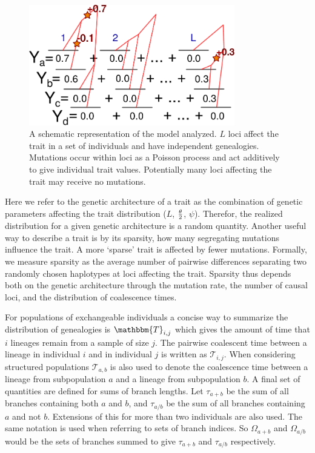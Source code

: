 \begin{figure}
  \centering
  \includegraphics[width=0.8\textwidth]{figures/schema.pdf}
  \caption{A schematic representation of the model analyzed.
  $L$ loci affect the trait in a set of individuals and have independent
  genealogies. Mutations occur within loci as a Poisson process and act
  additively to give individual trait values. Potentially many loci affecting
  the trait may receive no mutations.}
  \label{fig:schema}
\end{figure}

Here we refer to the genetic architecture of a trait as the combination of
genetic parameters affecting the trait distribution ($L$, $\frac{\theta}{2}$, $\psi$).
Therefor, the realized distribution for a given genetic architecture is a random
quantity. Another useful way to describe a trait is by its sparsity, how many
segregating mutations influence the trait. A more `sparse' trait is affected by
fewer mutations. Formally, we measure sparsity as the average number of pairwise
differences separating two randomly chosen haplotypes at loci affecting the
trait. Sparsity thus depends both on the genetic architecture through the
mutation rate, the number of causal loci, and the distribution of coalescence
times.

For populations of exchangeable individuals a concise way to summarize the
distribution of genealogies is $\mathbbm{T}_{i,j}$ which gives the amount of
time that $i$ lineages remain from a sample of size $j$. The pairwise coalescent
time between a lineage in individual $i$ and in individual $j$ is written as
$\mathcal{T}_{i,j}$. When considering structured populations $\mathcal{T}_{a,b}$
is also used to denote the coalescence time between a lineage from subpopulation
$a$ and a lineage from subpopulation $b$. A final set of quantities are defined
for sums of branch lengths. Let $\tau_{a+b}$ be the sum of all branches
containing both $a$ and $b$, and $\tau_{a/b}$ be the sum of all branches
containing $a$ and not $b$. Extensions of this for more than two individuals are
also used. The same notation is used when referring to sets of branch indices.
So $\Omega_{a+b}$ and $\Omega_{a/b}$ would be the sets of branches summed to
give $\tau_{a+b}$ and $\tau_{a/b}$ respectively.


